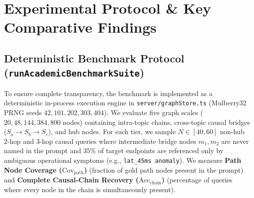 \documentclass[10pt]{article}
\begin{document}
\section{Experimental Protocol \& Key Comparative Findings}
\label{sec:eval}

\subsection{Deterministic Benchmark Protocol (\texttt{runAcademicBenchmarkSuite})}
To ensure complete transparency, the benchmark is implemented as a deterministic in-process execution engine in \texttt{server/graphStore.ts} (Mulberry32 PRNG seeds $42, 101, 202, 303, 404$). We evaluate five graph scales ($20, 48, 144, 384, 800$ nodes) containing intra-topic chains, cross-topic causal bridges ($S_a \to S_b \to S_c$), and hub nodes. For each tier, we sample $N \in [40, 60]$ non-hub $2$-hop and $3$-hop causal queries where intermediate bridge nodes $m_1, m_2$ are never named in the prompt and $35\%$ of target endpoints are referenced only by ambiguous operational symptoms (e.g., \texttt{lat\_45ms anomaly}). We measure \textbf{Path Node Coverage ($\mathrm{Cov}_{\mathrm{path}}$)} (fraction of gold path nodes present in the prompt) and \textbf{Complete Causal-Chain Recovery ($\mathrm{Acc}_{\mathrm{chain}}$)} (percentage of queries where every node in the chain is simultaneously present).
\end{document}

